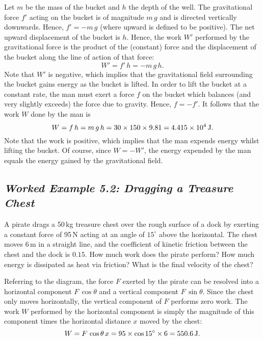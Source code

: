  Let $m$ be the mass of the bucket and $h$ the depth of
the well. The gravitational force $f'$ acting on the bucket is of magnitude $m\,g$ and
is directed vertically downwards. Hence, $f'=-m\,g$ (where upward is defined to be positive).
The net upward displacement of the bucket is $h$. Hence, the work $W'$ performed by the
gravitational force is the product of the (constant) force and the displacement of the
bucket along the line of action of that force:
$$
W' = f'\,h= - m\,g\,h.
$$
Note that $W'$ is negative, which implies that the gravitational field surrounding the
bucket gains energy as the bucket is lifted.
In order to lift the bucket at a constant rate, the man must exert a force $f$ on the
bucket which balances (and very slightly exceeds) the force due to gravity.
Hence, $f=-f'$. It follows that the work $W$ done by the man is
$$
W = f\,h = m\,g\,h = 30\times 150\times 9.81 = 4.415\times 10^4\,{\rm J}.
$$
Note that the work is positive, which implies that the man expends energy whilst
lifting the bucket. Of course, since $W=-W'$,  the energy expended by the
man equals the energy gained by the gravitational field.

\subsection*{\em Worked Example 5.2: Dragging a Treasure Chest}
 A pirate drags a 50\,kg treasure chest over the rough
surface of a dock by exerting a constant force of 95\,N acting at an angle
of $15^\circ$ above the horizontal. The chest moves 6\,m in  a straight line,
and the coefficient of kinetic friction between the chest and the dock is $0.15$. 
How much work does the pirate perform? How much energy is dissipated as heat via
friction? What is the final velocity of the chest?
\begin{figure*}[h]
\epsfysize=2in
\centerline{}
\end{figure*}

 Referring to the  diagram, the force $F$ exerted by the
pirate can be resolved into a horizontal component $F\,\cos\theta$ and a vertical
component $F\,\sin\theta$. Since the chest only moves horizontally, the vertical
component of $F$ performs zero work. The work $W$ performed by the horizontal
component is simply the magnitude of this component times the horizontal distance
$x$ moved by the chest:
$$
W = F\,\cos\theta\,x = 95\times \cos 15^\circ\times 6 = 550.6\,{\rm J}.
$$

